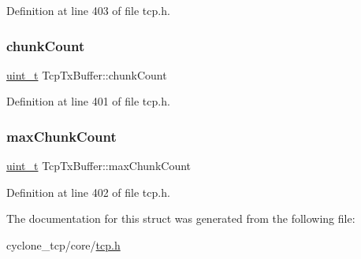 Definition at line 403 of file tcp.\+h.

\mbox{\label{structTcpTxBuffer_a38b16c419c204f70da1d12996eee3cc3}} 
\subsubsection{\texorpdfstring{chunk\+Count}{chunkCount}}
{\footnotesize\ttfamily \hyperlink{compiler__port_8h_a12a1e9b3ce141648783a82445d02b58d}{uint\+\_\+t} Tcp\+Tx\+Buffer\+::chunk\+Count}



Definition at line 401 of file tcp.\+h.

\mbox{\label{structTcpTxBuffer_ab514b670a5df5e06161daaff5663d255}} 
\subsubsection{\texorpdfstring{max\+Chunk\+Count}{maxChunkCount}}
{\footnotesize\ttfamily \hyperlink{compiler__port_8h_a12a1e9b3ce141648783a82445d02b58d}{uint\+\_\+t} Tcp\+Tx\+Buffer\+::max\+Chunk\+Count}



Definition at line 402 of file tcp.\+h.



The documentation for this struct was generated from the following file\+:\begin{DoxyCompactItemize}
\item 
cyclone\+\_\+tcp/core/\hyperlink{tcp_8h}{tcp.\+h}\end{DoxyCompactItemize}
